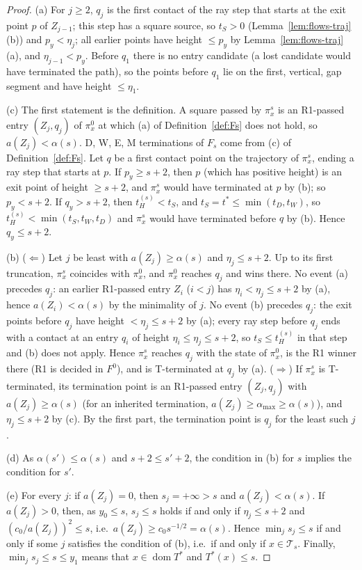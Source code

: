 \documentclass[11pt]{amsart}
\newcommand{\amax}{\alpha_{\max}}
\newcommand{\Fz}{F^{0}}
\newcommand{\Fs}{F_{s}}
\newcommand{\Tstar}{T^{*}}
\theoremstyle{definition}
\theoremstyle{remark}
\numberwithin{equation}{section}
\begin{document}
\begin{proof}
(a) For $j\ge2$, $q_j$ is the first contact of the ray step that starts at the exit point $p$ of $Z_{j-1}$; this step
has a square source, so $t_S>0$ (Lemma~\ref{lem:flows-traj}(b)) and $p_y<\eta_j$; all earlier points have height
$\le p_y$ by Lemma~\ref{lem:flows-traj}(a), and $\eta_{j-1}<p_y$. Before $q_1$ there is no entry candidate (a lost
candidate would have terminated the path), so the points before $q_1$ lie on the first, vertical, gap segment and have
height $\le\eta_1$.

(c) The first statement is the definition. A square passed by $\pi^s_x$ is an R1-passed entry $(Z_j,q_j)$ of $\pi^0_x$
at which (a) of Definition~\ref{def:Fs} does not hold, so $a(Z_j)<\alpha(s)$. D, W, E, M terminations of $\Fs$ come from
(c) of Definition~\ref{def:Fs}. Let $q$ be a first contact point on the trajectory of $\pi^s_x$, ending a ray step that
starts at $p$. If $p_y\ge s+2$, then $p$ (which has positive height) is an exit point of height $\ge s+2$, and $\pi^s_x$
would have terminated at $p$ by (b); so $p_y<s+2$. If $q_y>s+2$, then $t^{(s)}_H<t_S$, and $t_S=t^*\le\min(t_D,t_W)$, so
$t^{(s)}_H<\min(t_S,t_W,t_D)$ and $\pi^s_x$ would have terminated before $q$ by (b). Hence $q_y\le s+2$.

(b) ($\Leftarrow$) Let $j$ be least with $a(Z_j)\ge\alpha(s)$ and $\eta_j\le s+2$. Up to its first truncation, $\pi^s_x$
coincides with $\pi^0_x$, and $\pi^0_x$ reaches $q_j$ and wins there. No event (a) precedes $q_j$: an earlier R1-passed
entry $Z_i$ ($i<j$) has $\eta_i<\eta_j\le s+2$ by (a), hence $a(Z_i)<\alpha(s)$ by the minimality of $j$. No event (b)
precedes $q_j$: the exit points before $q_j$ have height $<\eta_j\le s+2$ by (a); every ray step before $q_j$ ends with a
contact at an entry $q_i$ of height $\eta_i\le\eta_j\le s+2$, so $t_S\le t^{(s)}_H$ in that step and (b) does not apply.
Hence $\pi^s_x$ reaches $q_j$ with the state of $\pi^0_x$, is the R1 winner there (R1 is decided in $\Fz$), and is
T-terminated at $q_j$ by (a). ($\Rightarrow$) If $\pi^s_x$ is T-terminated, its termination point is an R1-passed entry
$(Z_j,q_j)$ with $a(Z_j)\ge\alpha(s)$ (for an inherited termination, $a(Z_j)\ge\amax\ge\alpha(s)$), and $\eta_j\le s+2$ by
(c). By the first part, the termination point is $q_j$ for the least such $j$.

(d) As $\alpha(s')\le\alpha(s)$ and $s+2\le s'+2$, the condition in (b) for $s$ implies the condition for $s'$.

(e) For every $j$: if $a(Z_j)=0$, then $s_j=+\infty>s$ and $a(Z_j)<\alpha(s)$. If $a(Z_j)>0$, then, as $y_0\le s$,
$s_j\le s$ holds if and only if $\eta_j\le s+2$ and $(c_0/a(Z_j))^2\le s$, i.e.\ $a(Z_j)\ge c_0s^{-1/2}=\alpha(s)$. Hence
$\min_js_j\le s$ if and only if some $j$ satisfies the condition of (b), i.e.\ if and only if $x\in\mathcal T_s$. Finally,
$\min_js_j\le s\le y_1$ means that $x\in\operatorname{dom}\Tstar$ and $\Tstar(x)\le s$.


\end{proof}
\end{document}
